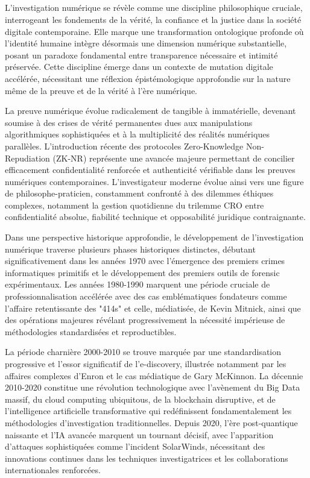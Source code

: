 \documentclass[12pt, a4paper]{article}
\begin{document}
		
	\subsection*{}
	L'investigation numérique se révèle comme une discipline philosophique cruciale, interrogeant les fondements de la vérité, la confiance et la justice dans la société digitale contemporaine. Elle marque une transformation ontologique profonde où l'identité humaine intègre désormais une dimension numérique substantielle, posant un paradoxe fondamental entre transparence nécessaire et intimité préservée. Cette discipline émerge dans un contexte de mutation digitale accélérée, nécessitant une réflexion épistémologique approfondie sur la nature même de la preuve et de la vérité à l'ère numérique.
	
	La preuve numérique évolue radicalement de tangible à immatérielle, devenant soumise à des crises de vérité permanentes dues aux manipulations algorithmiques sophistiquées et à la multiplicité des réalités numériques parallèles. L'introduction récente des protocoles Zero-Knowledge Non-Repudiation (ZK-NR) représente une avancée majeure permettant de concilier efficacement confidentialité renforcée et authenticité vérifiable dans les preuves numériques contemporaines. L'investigateur moderne évolue ainsi vers une figure de philosophe-praticien, constamment confronté à des dilemmes éthiques complexes, notamment la gestion quotidienne du trilemme CRO entre confidentialité absolue, fiabilité technique et opposabilité juridique contraignante.
	
	Dans une perspective historique approfondie, le développement de l'investigation numérique traverse plusieurs phases historiques distinctes, débutant significativement dans les années 1970 avec l'émergence des premiers crimes informatiques primitifs et le développement des premiers outils de forensic expérimentaux. Les années 1980-1990 marquent une période cruciale de professionnalisation accélérée avec des cas emblématiques fondateurs comme l'affaire retentissante des "414s" et celle, médiatisée, de Kevin Mitnick, ainsi que des opérations majeures révélant progressivement la nécessité impérieuse de méthodologies standardisées et reproductibles.
	
	\medskip
	La période charnière 2000-2010 se trouve marquée par une standardisation progressive et l'essor significatif de l'e-discovery, illustrée notamment par les affaires complexes d'Enron et le cas médiatique de Gary McKinnon. La décennie 2010-2020 constitue une révolution technologique avec l'avènement du Big Data massif, du cloud computing ubiquitous, de la blockchain disruptive, et de l'intelligence artificielle transformative qui redéfinissent fondamentalement les méthodologies d'investigation traditionnelles. Depuis 2020, l'ère post-quantique naissante et l'IA avancée marquent un tournant décisif, avec l'apparition d'attaques sophistiquées comme l'incident SolarWinds, nécessitant des innovations continues dans les techniques investigatrices et les collaborations internationales renforcées.
	
\end{document}
